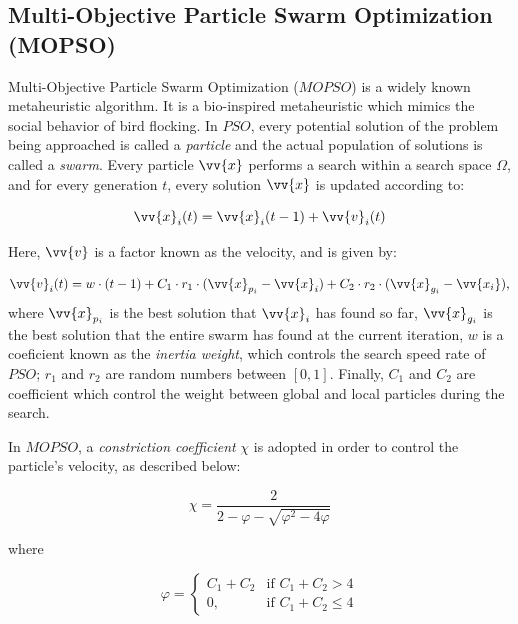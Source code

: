 \documentclass[11pt]{article}
\begin{document}
\subsection{Multi-Objective Particle Swarm Optimization (MOPSO)}

Multi-Objective Particle Swarm Optimization ($MOPSO$) \cite{nebro2009smpso} is a widely known metaheuristic algorithm. It is a bio-inspired metaheuristic which mimics the social behavior of bird flocking. In $PSO$, every potential solution of the problem being approached is called a \textit{particle} and the actual population of solutions is called a \textit{swarm}. Every particle $\vv{x}$ performs a search within a search space $\Omega$, and for every generation $t$, every solution $\vv{x}$ is updated according to:

\begin{equation}\label{eq:posicion1}
\vv{x}_i(t) = \vv{x}_i(t-1) + \vv{v}_i(t)
\end{equation}

Here, $\vv{v}$ is a factor known as the velocity, and is given by:

\begin{equation}\label{eq:velocidad1}
 \vv{v}_i(t) = w \cdot (t-1) + C_1 \cdot r_1 \cdot (\vv{x}_{p_i} - \vv{x}_i) + C_2 \cdot r_2 \cdot (\vv{x}_{g_i} - \vv{x_i}) \text{,}
\end{equation}
where $\vv{x}_{p_i}$ is the best solution that $\vv{x}_i$ has found so far, $\vv{x}_{g_i}$ is the best solution that the entire swarm has found at the current iteration, $w$ is a coeficient known as the \textit{inertia weight}, which controls the search speed rate of $PSO$; $r_1$ and $r_2$ are random numbers between $[0,1]$. Finally, $C_1$ and $C_2$ are coefficient which control the weight between global and local particles during the search.

In $MOPSO$, a \textit{constriction coefficient} $\chi$ is adopted in order to control the particle's velocity, as described below:

\begin{equation}
\chi = \frac{2}{2 - \varphi - \sqrt{\varphi^2 - 4 \varphi}}
\end{equation}

where

\begin{equation}
    \varphi= 
\begin{cases}
    C_1 + C_2 & \text{if } C_1 + C_2 > 4\\
    0,              & \text{if } C_1 + C_2 \leq 4
\end{cases}
\end{equation}
\end{document}
